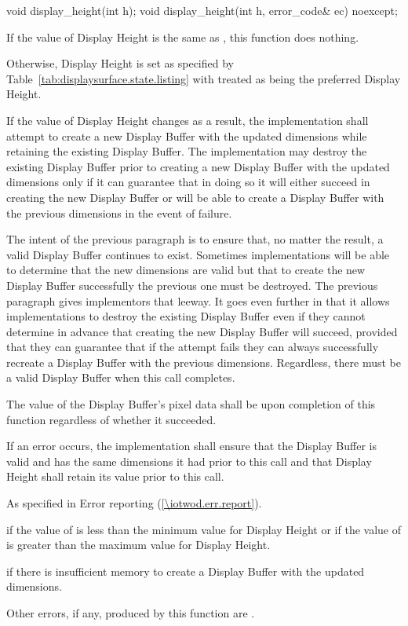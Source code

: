 \begin{itemdecl}
void display_height(int h);
void display_height(int h, error_code& ec) noexcept;
\end{itemdecl}
\begin{itemdescr}
\pnum
\effects
If the value of Display Height is the same as , this function does nothing.

\pnum
Otherwise, Display Height is set as specified by Table~\ref{tab:displaysurface.state.listing} with  treated as being the preferred Display Height.

\pnum
If the value of Display Height changes as a result, the implementation shall attempt to create a new Display Buffer with the updated dimensions while retaining the existing Display Buffer. The implementation may destroy the existing Display Buffer prior to creating a new Display Buffer with the updated dimensions only if it can guarantee that in doing so it will either succeed in creating the new Display Buffer or will be able to create a Display Buffer with the previous dimensions in the event of failure.

\pnum
\enternote
The intent of the previous paragraph is to ensure that, no matter the result, a valid Display Buffer continues to exist. Sometimes implementations will be able to determine that the new dimensions are valid but that to create the new Display Buffer successfully the previous one must be destroyed. The previous paragraph gives implementors that leeway. It goes even further in that it allows implementations to destroy the existing Display Buffer even if they cannot determine in advance that creating the new Display Buffer will succeed, provided that they can guarantee that if the attempt fails they can always successfully recreate a Display Buffer with the previous dimensions. Regardless, there must be a valid Display Buffer when this call completes.
\exitnote

\pnum
The value of the Display Buffer's pixel data shall be \unspecnorm upon completion of this function regardless of whether it succeeded.

\pnum
If an error occurs, the implementation shall ensure that the Display Buffer is valid and has the same dimensions it had prior to this call and that Display Height shall retain its value prior to this call.

\pnum
\throws
As specified in Error reporting (\ref{\iotwod.err.report}).

\pnum
\errors
{} if the value of  is less than the minimum value for Display Height or if the value of  is greater than the maximum value for Display Height.

 if there is insufficient memory to create a Display Buffer with the updated dimensions.

Other errors, if any, produced by this function are .
\end{itemdescr}

